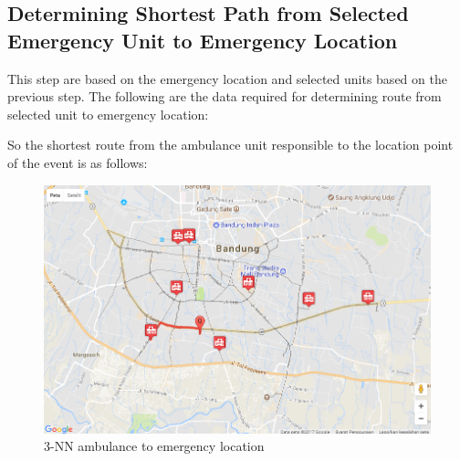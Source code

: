 \begin{table}[H]
\end{table}

\pagebreak
\subsection{Determining Shortest Path from Selected Emergency Unit to Emergency Location}
This step are based on the emergency location and selected units based on the previous step. The following are the data required for determining route from selected unit to emergency location:
\begin{table}[H]
\end{table}

So the shortest route from the ambulance unit responsible to the location point of the event is as follows:

\begin{figure}[H]
    \centering
    \includegraphics[scale=0.6]{rute_ambulans1.png}
    \caption{3-NN ambulance to emergency location}
    \label{fig:my_label}
\end{figure}
